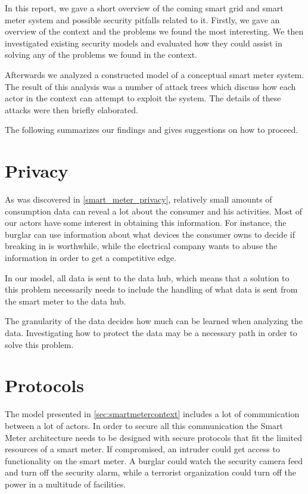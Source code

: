 In this report, we gave a short overview of the coming smart grid and smart meter system and possible security pitfalls related to it.
Firstly, we gave an overview of the context and the problems we found the most interesting.
We then investigated existing security models and evaluated how they could assist in solving any of the problems we found in the context.

Afterwards we analyzed a constructed model of a conceptual smart meter system.
The result of this analysis was a number of attack trees which discuss how each actor in the context can attempt to exploit the system.
The details of these attacks were then briefly elaborated.

The following summarizes our findings and gives suggestions on how to proceed.

\section{Privacy}
As was discovered in \cref{smart_meter_privacy}, relatively small amounts of consumption data can reveal a lot about the consumer and his activities.
Most of our actors have some interest in obtaining this information.
For instance, the burglar can use information about what devices the consumer owns to decide if breaking in is worthwhile, while the electrical company wants to abuse the information in order to get a competitive edge.

In our model, all data is sent to the data hub, which means that a solution to this problem necessarily needs to include the handling of what data is sent from the smart meter to the data hub.

The granularity of the data decides how much can be learned when analyzing the data.
Investigating how to protect the data may be a necessary path in order to solve this problem.

\section{Protocols}
The model presented in \cref{sec:smartmetercontext} includes a lot of communication between a lot of actors.
In order to secure all this communication the Smart Meter architecture needs to be designed with secure protocols that fit the limited resources of a smart meter.
If compromised, an intruder could get access to functionality on the smart meter.
A burglar could watch the security camera feed and turn off the security alarm, while a terrorist organization could turn off the power in a multitude of facilities.

